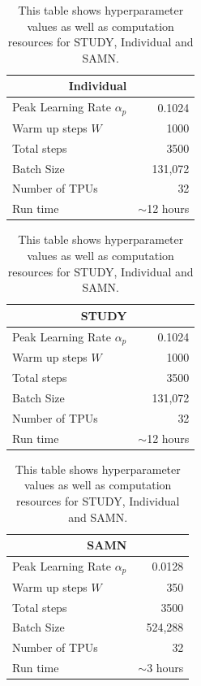 \documentclass{article}
\begin{document}
\begin{table}[h]
\centering
 \begin{subtable}[t]{\pageSplitL\linewidth}\centering
   \captionsetup{width=\captionwidthr\linewidth}
    \begin{tabular}{l r}
      \toprule
      \multicolumn{1}{r}{\bf Individual} & \\
      \midrule
      Peak Learning Rate $\alpha_p$  & 0.1024\\
      Warm up steps $W$ & 1000 \\
      Total steps & 3500 \\
      Batch Size & 131,072 \\
      Number of TPUs & 32 \\
      Run time & $\sim$12 hours \\
      \bottomrule
\end{tabular}

\vspace{4.47em}
\begin{tabular}{l r}
      \toprule
      \multicolumn{1}{r}{\bf STUDY} &  \\
      \midrule
      Peak Learning Rate $\alpha_p$  & 0.1024\\
    Warm up steps $W$ & 1000 \\
      Total steps & 3500 \\
      Batch Size & 131,072 \\
      Number of TPUs & 32 \\
      Run time & $\sim$12 hours \\
      \bottomrule
\end{tabular}
\end{subtable}%
\begin{subtable}[t]{\pageSplitR\linewidth}\centering
\captionsetup{width=\captionwidthr\linewidth}
  \centering
     \begin{tabular}{l r}
      \toprule
      \multicolumn{1}{r}{\bf SAMN} & \\
      \midrule
      Peak Learning Rate $\alpha_p$  & 0.0128\\
      Warm up steps $W$ & 350 \\
      Total steps & 3500 \\
      Batch Size & 524,288 \\
      Number of TPUs & 32 \\
      Run time & $\sim$3 hours \\
      \bottomrule
\end{tabular}
\end{subtable}
\vspace{3em}
\caption{This table shows hyperparameter values as well as computation resources for STUDY, Individual and SAMN.}
\label{table:hyperparams}
\end{table}
\clearpage
\end{document}
